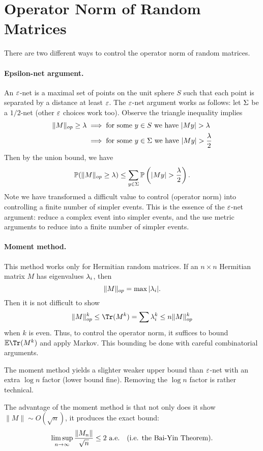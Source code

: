 \section*{Operator Norm of Random Matrices}

There are two different ways to control the operator norm of random matrices.

\paragraph{Epsilon-net argument.} An $\e$-net is a maximal set of points on the unit sphere $S$ such that each point is separated by a distance at least $\e$. The $\e$-net argument works as follows: let $\S$ be a $1/2$-net (other $\e$ choices work too). Observe the triangle inequality implies
\[
    \begin{split}
        \|M\|_{op} \ge \l & \implies \text{for some $y \in S$ we have } |My| > \l            \\
                          & \implies \text{for some $y \in \S$ we have } |My| > \frac{\l}{2} \\
    \end{split}
\]
Then by the union bound, we have
\[
    \bP(\|M\|_{op} \ge \l) \le \sum_{y \in \S} \bP\left(|My| > \frac{\l}{2}\right).
\]
Note we have transformed a difficult value to control (operator norm) into controlling a finite number of simpler events. This is the essence of the $\e$-net argument: reduce a complex event into simpler events, and the use metric arguments to reduce into a finite number of simpler events.

\paragraph{Moment method.} This method works only for Hermitian random matrices. If an $n \times n$ Hermitian matrix $M$ has eigenvalues $\l_i$, then
\[
    \|M\|_{op} = \max |\l_i|.
\]
Then it is not difficult to show
\[
    \|M\|^k_{op} \leq \Tr(M^k) = \sum \l_i^k \leq n\|M\|^k_{op}
\]
when $k$ is even. Thus, to control the operator norm, it suffices to bound $\bE \Tr(M^k)$ and apply Markov. This bounding be done with careful combinatorial arguments.

The moment method yields a slighter weaker upper bound than $\e$-net with an extra $\log n$ factor (lower bound fine). Removing the $\log n$ factor is rather technical.

The advantage of the moment method is that not only does it show $\|M\| \sim O(\sqrt{n})$, it produces the exact bound:
\[
    \limsup_{n \to \i} \frac{\|M_n\|}{\sqrt{n}} \le 2 \ \text{a.e.} \quad (\text{i.e. the Bai-Yin Theorem}).
\]


